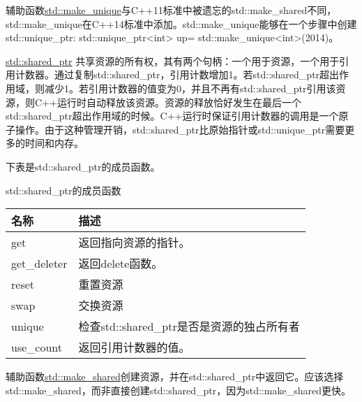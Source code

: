 

辅助函数\href{http://en.cppreference.com/w/cpp/memory/unique_ptr/make_unique}{std::make\_unique}与C++11标准中被遗忘的std::make\_shared不同，std::make\_unique在C++14标准中添加。std::make\_unique能够在一个步骤中创建std::unique\_ptr: std::unique\_ptr<int> up= std::make\_unique<int>(2014)。



\href{http://en.cppreference.com/w/cpp/memory/shared_ptr}{std::shared\_ptr} 共享资源的所有权，其有两个句柄：一个用于资源，一个用于引用计数器。通过复制std::shared\_ptr，引用计数增加1。若std::shared\_ptr超出作用域，则减少1。若引用计数器的值变为0，并且不再有std::shared\_ptr引用该资源，则C++运行时自动释放该资源。资源的释放恰好发生在最后一个std::shared\_ptr超出作用域的时候。C++运行时保证引用计数器的调用是一个原子操作。由于这种管理开销，std::shared\_ptr比原始指针或std::unique\_ptr需要更多的时间和内存。

下表是std::shared\_ptr的成员函数。

\begin{center}
std::shared\_ptr的成员函数
\end{center}

\begin{longtable}[c]{|l|l|}
\hline
\textbf{名称} & \textbf{描述}                                             \\ \hline
\endfirsthead
%
\endhead
%
get           & 返回指向资源的指针。                                \\ \hline
get\_deleter  & 返回delete函数。                                      \\ \hline
reset         & 重置资源                                              \\ \hline
swap          & 交换资源                                               \\ \hline
unique        & 检查std::shared\_ptr是否是资源的独占所有者 \\ \hline
use\_count    & 返回引用计数器的值。                      \\ \hline
\end{longtable}


辅助函数\href{http://en.cppreference.com/w/cpp/memory/shared_ptr/make_shared}{std::make\_shared}创建资源，并在std::shared\_ptr中返回它。应该选择std::make\_shared，而非直接创建std::shared\_ptr，因为std::make\_shared更快。

